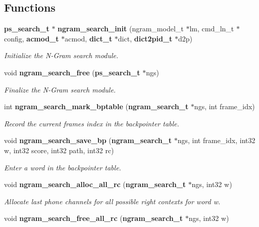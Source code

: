 \subsection*{Functions}
\begin{DoxyCompactItemize}
\item 
{\bf ps\+\_\+search\+\_\+t} $\ast$ {\bf ngram\+\_\+search\+\_\+init} (ngram\+\_\+model\+\_\+t $\ast$lm, cmd\+\_\+ln\+\_\+t $\ast$config, {\bf acmod\+\_\+t} $\ast$acmod, {\bf dict\+\_\+t} $\ast$dict, {\bf dict2pid\+\_\+t} $\ast$d2p)\label{ngram__search_8h_a1db74b6837f13db06470649d3ae84e80}

\begin{DoxyCompactList}\small\item\em Initialize the N-\/\+Gram search module. \end{DoxyCompactList}\item 
void {\bf ngram\+\_\+search\+\_\+free} ({\bf ps\+\_\+search\+\_\+t} $\ast$ngs)\label{ngram__search_8h_a9bafaa4af5a9a4f9e76a8daf54ac4a11}

\begin{DoxyCompactList}\small\item\em Finalize the N-\/\+Gram search module. \end{DoxyCompactList}\item 
int {\bf ngram\+\_\+search\+\_\+mark\+\_\+bptable} ({\bf ngram\+\_\+search\+\_\+t} $\ast$ngs, int frame\+\_\+idx)
\begin{DoxyCompactList}\small\item\em Record the current frame\textquotesingle{}s index in the backpointer table. \end{DoxyCompactList}\item 
void {\bf ngram\+\_\+search\+\_\+save\+\_\+bp} ({\bf ngram\+\_\+search\+\_\+t} $\ast$ngs, int frame\+\_\+idx, int32 w, int32 score, int32 path, int32 rc)\label{ngram__search_8h_ae36649be6f5a2190e759e7ed13bd7b6b}

\begin{DoxyCompactList}\small\item\em Enter a word in the backpointer table. \end{DoxyCompactList}\item 
void {\bf ngram\+\_\+search\+\_\+alloc\+\_\+all\+\_\+rc} ({\bf ngram\+\_\+search\+\_\+t} $\ast$ngs, int32 w)\label{ngram__search_8h_a1ddcc1a9cb3e164ceb2140097ed23a3e}

\begin{DoxyCompactList}\small\item\em Allocate last phone channels for all possible right contexts for word w. \end{DoxyCompactList}\item 
void {\bf ngram\+\_\+search\+\_\+free\+\_\+all\+\_\+rc} ({\bf ngram\+\_\+search\+\_\+t} $\ast$ngs, int32 w)\label{ngram__search_8h_a15477192481dffcb29e9c4167eff6c3c}


\end{DoxyCompactItemize}
